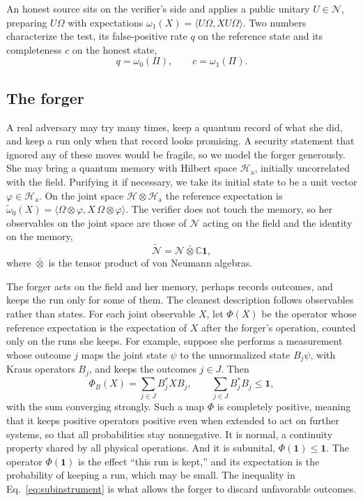 \documentclass[11pt,a4paper]{article}
\newcommand{\N}{\mathcal{N}}
\newcommand{\Hil}{\mathcal{H}}
\begin{document}
An honest source sits on the verifier's side and applies a public unitary $U\in\N$, preparing $U\Omega$ with expectations $\omega_1(X)=\langle U\Omega,XU\Omega\rangle$. Two numbers characterize the test, its false-positive rate $q$ on the reference state and its completeness $c$ on the honest state,
\begin{equation}
q=\omega_0(\Pi),
\qquad
c=\omega_1(\Pi).
\label{eq:q-c}
\end{equation}

\subsection{The forger}

A real adversary may try many times, keep a quantum record of what she did, and keep a run only when that record looks promising. A security statement that ignored any of these moves would be fragile, so we model the forger generously. She may bring a quantum memory with Hilbert space $\Hil_{\mathrm a}$, initially uncorrelated with the field. Purifying it if necessary, we take its initial state to be a unit vector $\varphi\in\Hil_{\mathrm a}$. On the joint space $\Hil\otimes\Hil_{\mathrm a}$ the reference expectation is $\widetilde\omega_0(X)=\langle\Omega\otimes\varphi,X\,\Omega\otimes\varphi\rangle$. The verifier does not touch the memory, so her observables on the joint space are those of $\N$ acting on the field and the identity on the memory,
\begin{equation}
\widetilde{\N}=\N\bar\otimes\mathbb C\mathbf{1},
\label{eq:extended-reference}
\end{equation}
where $\bar\otimes$ is the tensor product of von Neumann algebras.

The forger acts on the field and her memory, perhaps records outcomes, and keeps the run only for some of them. The cleanest description follows observables rather than states. For each joint observable $X$, let $\Phi(X)$ be the operator whose reference expectation is the expectation of $X$ after the forger's operation, counted only on the runs she keeps. For example, suppose she performs a measurement whose outcome $j$ maps the joint state $\psi$ to the unnormalized state $B_j\psi$, with Kraus operators $B_j$, and keeps the outcomes $j\in J$. Then
\begin{equation}
\Phi_B(X)=\sum_{j\in J}B_j^*XB_j,
\qquad
\sum_{j\in J}B_j^*B_j\le\mathbf{1},
\label{eq:subinstrument}
\end{equation}
with the sum converging strongly. Such a map $\Phi$ is completely positive, meaning that it keeps positive operators positive even when extended to act on further systems, so that all probabilities stay nonnegative. It is normal, a continuity property shared by all physical operations. And it is subunital, $\Phi(\mathbf{1})\le\mathbf{1}$. The operator $\Phi(\mathbf{1})$ is the effect ``this run is kept,'' and its expectation is the probability of keeping a run, which may be small. The inequality in Eq.~\eqref{eq:subinstrument} is what allows the forger to discard unfavorable outcomes.
\end{document}
